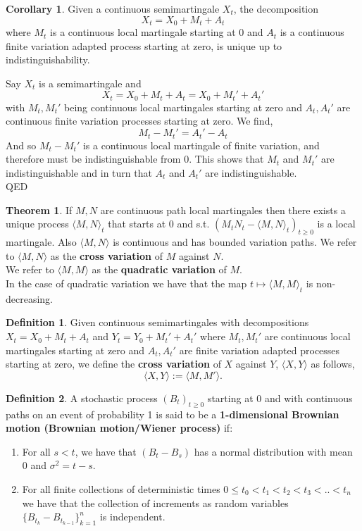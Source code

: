 \documentclass[12pt]{article}
\newcommand{\la}{\langle}
\newcommand{\ra}{\rangle}
\newcommand{\QED}{\hspace*{\fill}\textup{QED}}
\theoremstyle{definition}
\newtheorem{defn}{Definition}
\newtheorem{thm}{Theorem}
\newtheorem{cor}{Corollary}
\begin{document}
\begin{cor}
    Given a continuous semimartingale $X_t$, the decomposition
    \[
        X_t = X_0 + M_t + A_t
    \]
    where $M_t$ is a continuous local martingale starting at 0 and $A_t$ is a continuous finite variation adapted process starting at zero, is unique up to indistinguishability.

    \proof 
    Say $X_t$ is a semimartingale and
    \[
        X_t = X_0 + M_t + A_t = X_0 + M_t' + A_t'
    \]
    with $M_t, M_t'$ being continuous local martingales starting at zero and $A_t, A_t'$ are continuous finite variation processes starting at zero.
    We find,
    \[
        M_t - M_t' = A_t' - A_t
    \]
    And so $M_t - M_t'$ is a continuous local martingale of finite variation, and therefore must be indistinguishable from 0.
    This shows that $M_t$ and $M_t'$ are indistinguishable and in turn that $A_t$ and $A_t'$ are indistinguishable. \\
    \QED 
\end{cor}

\begin{thm} \cite{revuz1990}
    If $M,N$ are continuous path local martingales then there exists a unique process $\la M, N \ra_t$ that starts at 0 and s.t. $(M_t N_t - \la M, N \ra_t)_{t \geq 0}$ is a local martingale.
    Also $\la M, N \ra$ is continuous and has bounded variation paths.
    We refer to $\la M, N \ra$ as the \textbf{cross variation} of $M$ against $N$. \\
    We refer to $\la M, M \ra$ as the \textbf{quadratic variation} of $M$. \\
    In the case of quadratic variation we have that the map $t \mapsto \la M, M \ra_t$ is non-decreasing. \\
\end{thm}

\begin{defn}
    Given continuous semimartingales with decompositions $X_t = X_0 + M_t + A_t$ and $Y_t = Y_0 + M_t' + A_t'$
    where $M_t, M_t'$ are continuous local martingales starting at zero and $A_t, A_t'$ are finite variation adapted processes starting at zero,
    we define the \textbf{cross variation} of $X$ against $Y$, $\la X, Y \ra$ as follows,
    \[
        \la X, Y \ra := \la M, M' \ra.
    \]
\end{defn}

\begin{defn}
    A stochastic process $(B_t)_{t \geq 0}$ starting at 0 and with continuous paths on an event of probability 1 is said to be a \textbf{1-dimensional Brownian motion (Brownian motion/Wiener process)} if:
    \begin{enumerate}
        \item[(i)] For all $s < t$, we have that $(B_t - B_s)$ has a normal distribution with mean $0$ and $\sigma^2 = t-s$.
        \item[(ii)] For all finite collections of deterministic times $0 \leq t_0 < t_1 < t_2 < t_3 < .. < t_n$ we have that the collection of increments as random variables $\{B_{t_k} - B_{t_{k-1}}\}_{k=1}^n$ is independent.
    \end{enumerate}
\end{defn}
\end{document}
